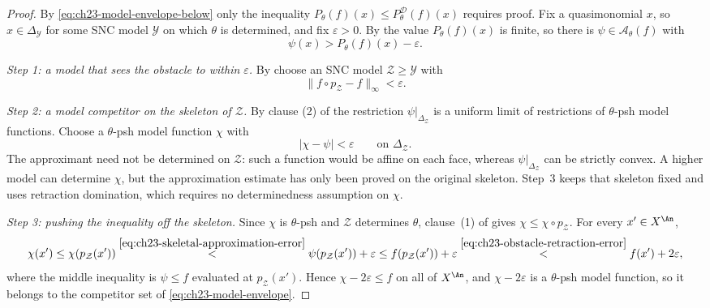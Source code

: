 \begin{proof}
By \eqref{eq:ch23-model-envelope-below} only the inequality
$P_\theta(f)(x)\leq P^{\mathcal D}_\theta(f)(x)$ requires proof.  Fix a
quasimonomial $x$, so $x\in\Delta_{\mathcal Y}$ for some SNC model
$\mathcal Y$ on which $\theta$ is determined, and fix $\varepsilon>0$.
By  the value $P_\theta(f)(x)$ is finite,
so there is $\psi\in\mathcal A_\theta(f)$ with
\begin{equation}\label{eq:ch23-competitor-near-x}
 \psi(x)>P_\theta(f)(x)-\varepsilon .
\end{equation}

\emph{Step 1: a model that sees the obstacle to within $\varepsilon$.}
By  choose an SNC model
$\mathcal Z\geq\mathcal Y$ with
\begin{equation}\label{eq:ch23-obstacle-retraction-error}
 \|f\circ p_{\mathcal Z}-f\|_\infty<\varepsilon .
\end{equation}

\emph{Step 2: a model competitor on the skeleton of $\mathcal Z$.}
By clause (2) of  the restriction
$\psi|_{\Delta_{\mathcal Z}}$ is a uniform limit of restrictions of
$\theta$-psh model functions.  Choose a $\theta$-psh model function
$\chi$ with
\begin{equation}\label{eq:ch23-skeletal-approximation-error}
 \bigl|\chi-\psi\bigr|<\varepsilon
 \qquad\text{on }\Delta_{\mathcal Z}.
\end{equation}
The approximant need not be determined on $\mathcal Z$: such a function
would be affine on each face, whereas $\psi|_{\Delta_{\mathcal Z}}$
can be strictly convex.  A higher model can determine $\chi$, but the
approximation estimate has only been proved on the original skeleton.
Step~3 keeps that skeleton fixed and uses retraction domination, which
requires no determinedness assumption on $\chi$.

\emph{Step 3: pushing the inequality off the skeleton.}  Since $\chi$ is
$\theta$-psh and $\mathcal Z$ determines $\theta$, clause~(1) of
 gives $\chi\leq\chi\circ p_{\mathcal Z}$.  For
every $x'\in X^{\An}$,
\[
 \chi(x')\leq\chi(p_{\mathcal Z}(x'))
 \overset{\eqref{eq:ch23-skeletal-approximation-error}}{<}
 \psi(p_{\mathcal Z}(x'))+\varepsilon
 \leq f(p_{\mathcal Z}(x'))+\varepsilon
 \overset{\eqref{eq:ch23-obstacle-retraction-error}}{<}
 f(x')+2\varepsilon ,
\]
where the middle inequality is $\psi\leq f$ evaluated at
$p_{\mathcal Z}(x')$.  Hence
$\chi-2\varepsilon\leq f$ on all of $X^{\An}$, and
$\chi-2\varepsilon$ is a $\theta$-psh model function, so it belongs to
the competitor set of \eqref{eq:ch23-model-envelope}.


\end{proof}
